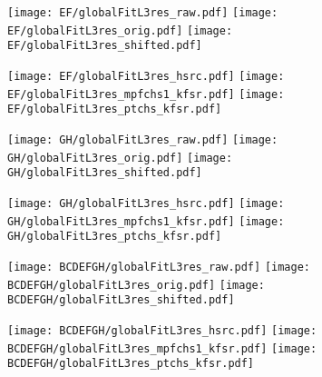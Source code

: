 \documentclass[landscape,10pt]{beamer} %
\newcommand{\commentout}[1]{}
\begin{document}
\newpage

\begin{figure}[p]
\centering
  \texttt{[image: EF/globalFitL3res\_raw.pdf]}
  \texttt{[image: EF/globalFitL3res\_orig.pdf]}
  \texttt{[image: EF/globalFitL3res\_shifted.pdf]}
\end{figure}
\begin{figure}[p]
\centering
  \texttt{[image: EF/globalFitL3res\_hsrc.pdf]}
  \texttt{[image: EF/globalFitL3res\_mpfchs1\_kfsr.pdf]}
  \texttt{[image: EF/globalFitL3res\_ptchs\_kfsr.pdf]}
\end{figure}

\newpage

\begin{figure}[p]
\centering
  \texttt{[image: GH/globalFitL3res\_raw.pdf]}
  \texttt{[image: GH/globalFitL3res\_orig.pdf]}
  \texttt{[image: GH/globalFitL3res\_shifted.pdf]}
\end{figure}
\begin{figure}[p]
\centering
  \texttt{[image: GH/globalFitL3res\_hsrc.pdf]}
  \texttt{[image: GH/globalFitL3res\_mpfchs1\_kfsr.pdf]}
  \texttt{[image: GH/globalFitL3res\_ptchs\_kfsr.pdf]}
\end{figure}

\newpage

\begin{figure}[p]
\centering
  \texttt{[image: BCDEFGH/globalFitL3res\_raw.pdf]}
  \texttt{[image: BCDEFGH/globalFitL3res\_orig.pdf]}
  \texttt{[image: BCDEFGH/globalFitL3res\_shifted.pdf]}
\end{figure}
\begin{figure}[p]
\centering
  \texttt{[image: BCDEFGH/globalFitL3res\_hsrc.pdf]}
  \texttt{[image: BCDEFGH/globalFitL3res\_mpfchs1\_kfsr.pdf]}
  \texttt{[image: BCDEFGH/globalFitL3res\_ptchs\_kfsr.pdf]}
\end{figure}

\commentout{
\newpage

\begin{figure}[p]
\centering
  \texttt{[image: L4/globalFitL3res\_raw.pdf]}
  \texttt{[image: L4/globalFitL3res\_orig.pdf]}
  \texttt{[image: L4/globalFitL3res\_shifted.pdf]}
\end{figure}
\begin{figure}[p]
\centering
  \texttt{[image: L4/globalFitL3res\_hsrc.pdf]}
  \texttt{[image: L4/globalFitL3res\_mpfchs1\_kfsr.pdf]}
  \texttt{[image: L4/globalFitL3res\_ptchs\_kfsr.pdf]}
\end{figure}
}%
\end{document}

